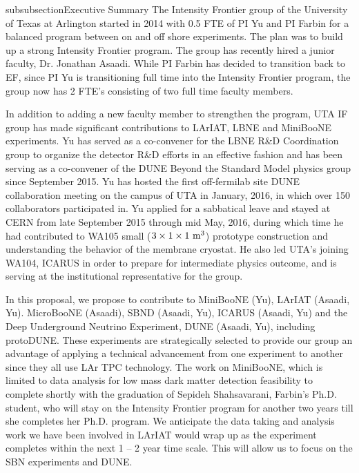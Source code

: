 

subsubsection{Executive Summary}
The Intensity Frontier group of the University of Texas at Arlington started in 2014 with 0.5 FTE of PI Yu and PI Farbin for a balanced program between on and off shore experiments.   
The plan was to build up a strong Intensity Frontier program.   
The group has recently hired a junior faculty, Dr. Jonathan Asaadi.
While PI Farbin has decided to transition back to EF, since PI Yu is transitioning full time into the Intensity Frontier program, 
the group now has 2 FTE’s consisting of two full time faculty members.

In addition to adding a new faculty member to strengthen the program, UTA IF group has made significant contributions to LArIAT, LBNE and MiniBooNE experiments.  
Yu has served as a co-convener for the LBNE R\&D Coordination group to organize the detector R\&D efforts in an effective fashion and has been serving as a co-convener of the DUNE Beyond the Standard Model physics group since September 2015. 
Yu has hosted the first off-fermilab site DUNE collaboration meeting on the campus of UTA in January, 2016, in which over 150 collaborators participated in.
Yu applied for a sabbatical leave and stayed at CERN from late September 2015 through mid May, 2016, 
during which time he had contributed to WA105 small ($3\times 1 \times 1~{\rm m^{3}}$) prototype construction and understanding the behavior of
the membrane cryostat.
He also led UTA’s joining WA104, ICARUS in order to prepare for intermediate physics outcome, and is serving at the institutional representative for the group.

In this proposal, we propose to contribute to MiniBooNE (Yu), LArIAT (Asaadi, Yu). MicroBooNE (Asaadi), SBND (Asaadi, Yu), ICARUS (Asaadi, Yu) and the Deep Underground Neutrino Experiment, DUNE (Asaadi, Yu), including protoDUNE.  
These experiments are strategically selected to provide our group an advantage of applying a technical advancement from one experiment to another since they all use LAr TPC technology.  
The work on MiniBooNE, which is limited to data analysis for low mass dark matter detection feasibility to complete shortly with the graduation of Sepideh Shahsavarani, Farbin’s Ph.D. student, who will stay on the Intensity Frontier program for another two years till she completes her Ph.D. program.
We anticipate the data taking and analysis work we have been involved in LArIAT would wrap up as the experiment completes within 
the next 1 – 2 year time scale.  
This will allow us to focus on the SBN experiments and DUNE.

